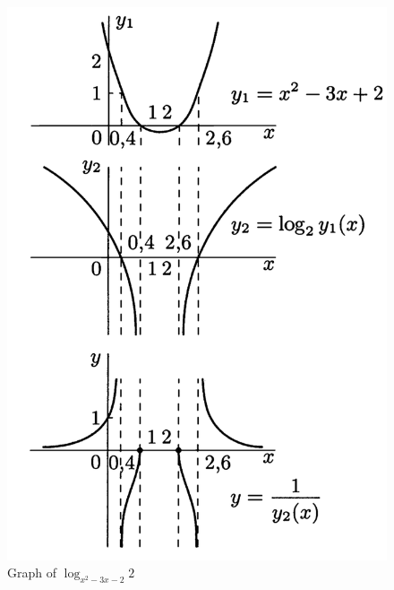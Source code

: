 \documentclass[a4paper,12pt]{article} %
\begin{document}
\graphicspath{ 
    {./Figs/}
}
\begin{figure}
    \centering
    \begin{minipage}[htbp]{0.4\textwidth}
        \includegraphics[width = \textwidth]{funplot1.png}
        \caption{Graph of $\log_{x^2 - 3x -2}2$}
    \end{minipage}
    \begin{minipage}[htbp]{0.4\textwidth}

\end{minipage}
\end{figure}
\end{document}
